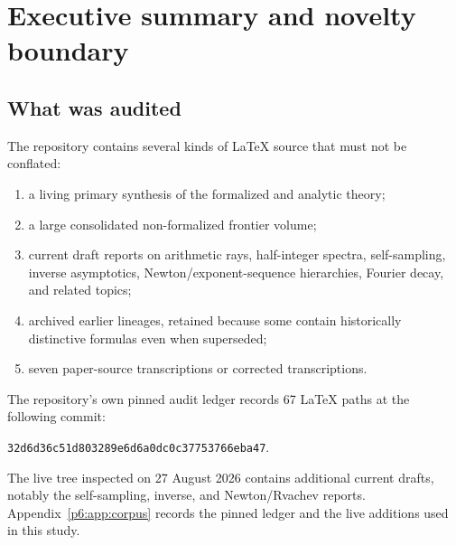 \documentclass[11pt]{article}
\theoremstyle{definition}
\theoremstyle{remark}
\begin{document}
\begin{abstract}
For the signed Thue--Morse generating function \(E(z)\), a new formal orthogonality
analysis proves
\[
 p_{2n}(x)=p_n(x^2),\qquad a_n=(-1)^{n+1},
\]
and gives an exact nonlinear dyadic recursion for the remaining Jacobi coefficients.
At \(N=2^m\), \(p_N(x)=x^N+1\), producing the closed Pad\'e approximant
\[
 E(z)=\frac{\prod_{j<m}(1-z^{2^j})}{1+z^N}+O(z^{2N}).
\]
Its roots-of-minus-one partial fractions furnish an \(N\)-node complex quadrature that
reproduces \(2N\) consecutive Thue--Morse signs.  Krawtchouk, contour, residue, integral,
and antiperiodic Fourier representations of the signed and unsigned words are collected as
well.  A fully commented Python program, exact rational data, high-precision residuals,
and four reproducible figures accompany the report.  Every theorem labelled as new is
proved here; conjectures are clearly separated from established statements.
\end{abstract}


\newpage

\section{Executive summary and novelty boundary}

\subsection{What was audited}

The repository contains several kinds of LaTeX source that must not be conflated:

\begin{enumerate}
\item a living primary synthesis of the formalized and analytic theory;
\item a large consolidated non-formalized frontier volume;
\item current draft reports on arithmetic rays, half-integer spectra, self-sampling,
      inverse asymptotics, Newton/exponent-sequence hierarchies, Fourier decay, and related
      topics;
\item archived earlier lineages, retained because some contain historically distinctive
      formulas even when superseded;
\item seven paper-source transcriptions or corrected transcriptions.
\end{enumerate}

The repository's own pinned audit ledger records 67 LaTeX paths at the following commit:
\begin{center}
\small\texttt{32d6d36c51d803289e6d6a0dc0c37753766eba47}.
\end{center}
The live tree inspected on 27 August 2026 contains additional current drafts, notably the
self-sampling, inverse, and Newton/Rvachev reports.  Appendix~\ref{p6:app:corpus} records the pinned ledger and the live
additions used in this study.
\end{document}
